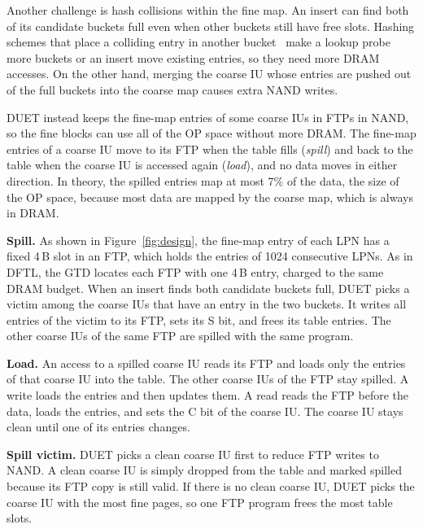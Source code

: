 Another challenge is hash collisions within the fine map. An insert can find
both of its candidate buckets full even when other buckets still have free slots.
Hashing schemes that place a colliding entry in another
bucket~\cite{cuckoo,onemove,hopscotch,robinhood} make a lookup probe more buckets or an
insert move existing entries, so they need more DRAM accesses. On the other hand,
merging the coarse IU whose entries are pushed out of the full buckets into the coarse map
causes extra NAND writes.

DUET instead keeps the fine-map entries of some coarse IUs in FTPs in NAND, so the
fine blocks can use all of the OP space without more DRAM.
The fine-map entries of a coarse IU move to its FTP when the table fills
(\emph{spill}) and back to the table when the coarse IU is accessed again
(\emph{load}), and no data moves in either direction. In theory, the spilled entries map
at most 7\% of the data, the size of the OP space, because most data are mapped by the
coarse map, which is always in DRAM.

\textbf{Spill.} As shown in Figure~\ref{fig:design}, the fine-map entry of each LPN has a
fixed 4\,B slot in an FTP,
which holds the entries of 1024 consecutive LPNs. As in DFTL, the GTD locates each
FTP with one 4\,B entry, charged to the same DRAM budget. When an insert finds both
candidate buckets full, DUET picks a victim among the coarse IUs that have an entry in
the two buckets. It writes all entries of the victim to its FTP, sets its S bit, and
frees its table entries. The other coarse IUs of the same FTP are spilled with the
same program.

\textbf{Load.} An access to a spilled coarse IU reads its FTP and loads only the
entries of that coarse IU into the table. The other
coarse IUs of the FTP stay spilled. A write loads the entries and then updates them.
A read reads the FTP before the data, loads the entries, and sets the C bit of the
coarse IU. The coarse IU stays clean until one of its entries changes.

\textbf{Spill victim.} DUET picks a clean coarse IU first to reduce FTP writes to NAND.
A clean coarse IU is simply dropped from the table and marked spilled because its FTP
copy is still valid. If there is no clean coarse IU, DUET picks the coarse IU with the
most fine pages, so one FTP program frees the most table slots.

